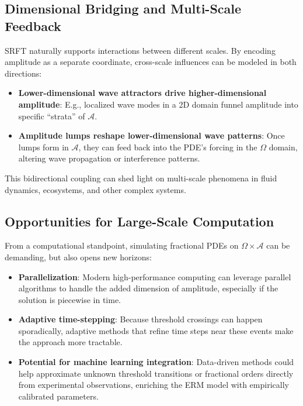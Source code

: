 \documentclass[12pt]{article}
\begin{document}
\subsection{Dimensional Bridging and Multi-Scale Feedback}
\label{subsec:dim_bridging}
SRFT naturally supports interactions between different scales. By encoding amplitude
as a separate coordinate, cross-scale influences can be modeled in both directions:
\begin{itemize}
    \item \textbf{Lower-dimensional wave attractors drive higher-dimensional amplitude}:
          E.g., localized wave modes in a 2D domain funnel amplitude into specific
          “strata” of $\mathcal{A}$.
    \item \textbf{Amplitude lumps reshape lower-dimensional wave patterns}:
          Once lumps form in $\mathcal{A}$, they can feed back into the PDE’s forcing
          in the $\Omega$ domain, altering wave propagation or interference patterns.
\end{itemize}
This bidirectional coupling can shed light on multi-scale phenomena in fluid
dynamics, ecosystems, and other complex systems.

\subsection{Opportunities for Large-Scale Computation}
\label{subsec:large_scale_computation}
From a computational standpoint, simulating fractional PDEs on $\Omega \times \mathcal{A}$
can be demanding, but also opens new horizons:
\begin{itemize}
    \item \textbf{Parallelization}: Modern high-performance computing can leverage
          parallel algorithms to handle the added dimension of amplitude, especially
          if the solution is piecewise in time.
    \item \textbf{Adaptive time-stepping}: Because threshold crossings can happen
          sporadically, adaptive methods that refine time steps near these events
          make the approach more tractable.
    \item \textbf{Potential for machine learning integration}: 
          Data-driven methods could help approximate unknown threshold transitions or
          fractional orders directly from experimental observations, enriching the ERM
          model with empirically calibrated parameters.
\end{itemize}
\end{document}
